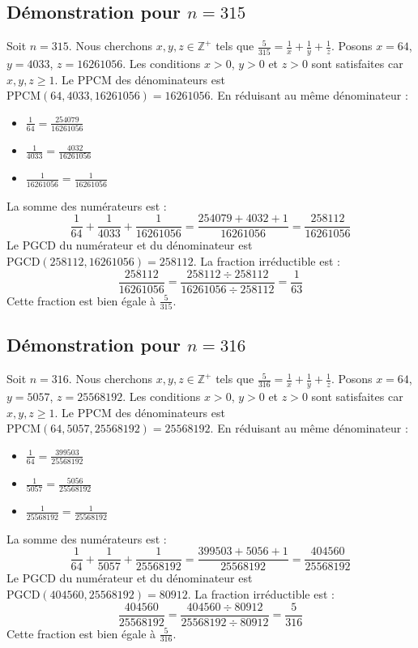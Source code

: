 \documentclass[11pt,a4paper]{article}
\begin{document}
\subsection{Démonstration pour $n = 315$}
Soit $n = 315$. Nous cherchons $x, y, z \in \mathbb{Z}^{+}$ tels que $\frac{5}{315} = \frac{1}{x} + \frac{1}{y} + \frac{1}{z}$.
Posons $x = 64$, $y = 4033$, $z = 16261056$.
Les conditions $x > 0$, $y > 0$ et $z > 0$ sont satisfaites car $x, y, z \geq 1$.
Le PPCM des dénominateurs est $\text{PPCM}(64, 4033, 16261056) = 16261056$.
En réduisant au même dénominateur :
\begin{itemize}
    \item $\frac{1}{64} = \frac{254079}{16261056}$
    \item $\frac{1}{4033} = \frac{4032}{16261056}$
    \item $\frac{1}{16261056} = \frac{1}{16261056}$
\end{itemize}
La somme des numérateurs est :
$$ \frac{1}{64} + \frac{1}{4033} + \frac{1}{16261056} = \frac{254079 + 4032 + 1}{16261056} = \frac{258112}{16261056} $$
Le PGCD du numérateur et du dénominateur est $\text{PGCD}(258112, 16261056) = 258112$.
La fraction irréductible est :
$$ \frac{258112}{16261056} = \frac{258112 \div 258112}{16261056 \div 258112} = \frac{1}{63} $$
Cette fraction est bien égale à $\frac{5}{315}$.

\subsection{Démonstration pour $n = 316$}
Soit $n = 316$. Nous cherchons $x, y, z \in \mathbb{Z}^{+}$ tels que $\frac{5}{316} = \frac{1}{x} + \frac{1}{y} + \frac{1}{z}$.
Posons $x = 64$, $y = 5057$, $z = 25568192$.
Les conditions $x > 0$, $y > 0$ et $z > 0$ sont satisfaites car $x, y, z \geq 1$.
Le PPCM des dénominateurs est $\text{PPCM}(64, 5057, 25568192) = 25568192$.
En réduisant au même dénominateur :
\begin{itemize}
    \item $\frac{1}{64} = \frac{399503}{25568192}$
    \item $\frac{1}{5057} = \frac{5056}{25568192}$
    \item $\frac{1}{25568192} = \frac{1}{25568192}$
\end{itemize}
La somme des numérateurs est :
$$ \frac{1}{64} + \frac{1}{5057} + \frac{1}{25568192} = \frac{399503 + 5056 + 1}{25568192} = \frac{404560}{25568192} $$
Le PGCD du numérateur et du dénominateur est $\text{PGCD}(404560, 25568192) = 80912$.
La fraction irréductible est :
$$ \frac{404560}{25568192} = \frac{404560 \div 80912}{25568192 \div 80912} = \frac{5}{316} $$
Cette fraction est bien égale à $\frac{5}{316}$.
\end{document}

